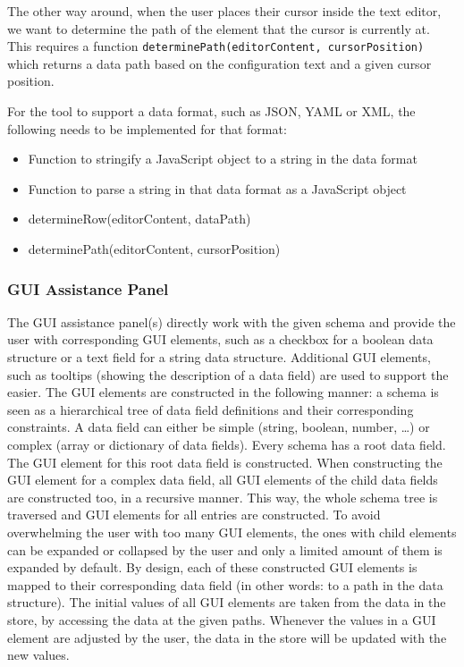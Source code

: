The other way around, when the user places their cursor inside the text editor, we want to determine the path of the element that the cursor is currently at. This requires a function \texttt{determinePath(editorContent, cursorPosition)} which returns a data path based on the configuration text and a given cursor position.

For the tool to support a data format, such as JSON, YAML or XML, the following needs to be implemented for that format:
\begin{itemize}
	\item Function to stringify a JavaScript object to a string in the data format
	\item Function to parse a string in that data format as a JavaScript object
	\item determineRow(editorContent, dataPath)
	\item determinePath(editorContent, cursorPosition)
\end{itemize}


\subsubsection{GUI Assistance Panel}
The GUI assistance panel(s) directly work with the given schema and provide the user with corresponding GUI elements, such as a checkbox for a boolean data structure or a text field for a string data structure.
Additional GUI elements, such as tooltips (showing the description of a data field) are used to support the easier.
The GUI elements are constructed in the following manner: a schema is seen as a hierarchical tree of data field definitions and their corresponding constraints.
A data field can either be simple (string, boolean, number, \ldots) or complex (array or dictionary of data fields).
Every schema has a root data field.
The GUI element for this root data field is constructed. %
When constructing the GUI element for a complex data field, all GUI elements of the child data fields are constructed too, in a recursive manner.
This way, the whole schema tree is traversed and GUI elements for all entries are constructed.
To avoid overwhelming the user with too many GUI elements, the ones with child elements can be expanded or collapsed by the user and only a limited amount of them is expanded by default.
By design, each of these constructed GUI elements is mapped to their corresponding data field (in other words: to a path in the data structure).
The initial values of all GUI elements are taken from the data in the store, by accessing the data at the given paths.
Whenever the values in a GUI element are adjusted by the user, the data in the store will be updated with the new values.



